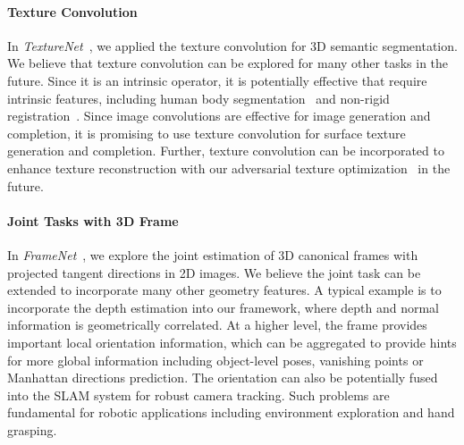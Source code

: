 \paragraph*{Texture Convolution} In \emph{TextureNet}~\cite{huang2018texturenet}, we applied the texture convolution for 3D semantic segmentation. We believe that texture convolution can be explored for many other tasks in the future. Since it is an intrinsic operator, it is potentially effective that require intrinsic features, including human body segmentation~\cite{maron2017convolutional} and non-rigid registration~\cite{litany2017deep}. Since image convolutions are effective for image generation and completion, it is promising to use texture convolution for surface texture generation and completion. Further, texture convolution can be incorporated to enhance texture reconstruction with our adversarial texture optimization~\cite{huang2020adversarial} in the future.

\paragraph*{Joint Tasks with 3D Frame} In \emph{FrameNet}~\cite{framenet}, we explore the joint estimation of 3D canonical frames with projected tangent directions in 2D images. We believe the joint task can be extended to incorporate many other geometry features. A typical example is to incorporate the depth estimation into our framework, where depth and normal information is geometrically correlated. At a higher level, the frame provides important local orientation information, which can be aggregated to provide hints for more global information including object-level poses, vanishing points or Manhattan directions prediction. The orientation can also be potentially fused into the SLAM system for robust camera tracking. Such problems are fundamental for robotic applications including environment exploration and hand grasping.
